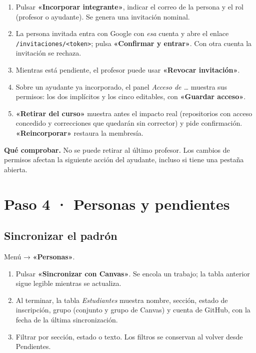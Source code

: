 \documentclass[11pt,a4paper]{article}
\newenvironment{comprobar}
  {\def\FrameCommand{\fcolorbox{verde}{verdefondo}}\MakeFramed{\advance\hsize-\width\FrameRestore}\noindent\textbf{\textcolor{verde}{Qué comprobar.}} }
  {\endMakeFramed}
\newcommand{\ui}[1]{\textbf{«#1»}}        %
\newcommand{\ruta}[1]{\texttt{#1}}        %
\begin{document}
\begin{enumerate}
  \item Pulsar \ui{Incorporar integrante}, indicar el correo de la persona y el rol (profesor o ayudante). Se genera una invitación nominal.
  \item La persona invitada entra con Google con \emph{esa} cuenta y abre el enlace \ruta{/invitaciones/<token>}; pulsa \ui{Confirmar y entrar}. Con otra cuenta la invitación se rechaza.
  \item Mientras está pendiente, el profesor puede usar \ui{Revocar invitación}.
  \item Sobre un ayudante ya incorporado, el panel \emph{Acceso de \ldots} muestra sus permisos: los dos implícitos y los cinco editables, con \ui{Guardar acceso}.
  \item \ui{Retirar del curso} muestra antes el impacto real (repositorios con acceso concedido y correcciones que quedarán sin corrector) y pide confirmación. \ui{Reincorporar} restaura la membresía.
\end{enumerate}

\begin{comprobar}
No se puede retirar al último profesor. Los cambios de permisos afectan la siguiente acción del ayudante, incluso si tiene una pestaña abierta.
\end{comprobar}

\section{Paso 4 · Personas y pendientes}

\subsection{Sincronizar el padrón}

Menú → \ui{Personas}.

\begin{enumerate}
  \item Pulsar \ui{Sincronizar con Canvas}. Se encola un trabajo; la tabla anterior sigue legible mientras se actualiza.
  \item Al terminar, la tabla \emph{Estudiantes} muestra nombre, sección, estado de inscripción, grupo (conjunto y grupo de Canvas) y cuenta de GitHub, con la fecha de la última sincronización.
  \item Filtrar por sección, estado o texto. Los filtros se conservan al volver desde Pendientes.
\end{enumerate}
\end{document}
